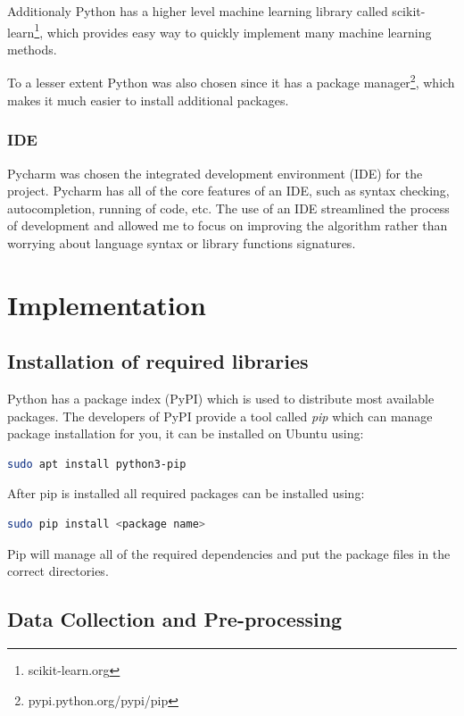 \documentclass[12pt,a4paper]{book}
\begin{document}
Additionaly Python has a higher level machine learning library called scikit-learn\footnote{scikit-learn.org}, which provides easy way to quickly implement many machine learning methods.

To a lesser extent Python was also chosen since it has a package manager\footnote{pypi.python.org/pypi/pip}, which makes it much easier to install additional packages.

\subsection{IDE}
Pycharm was chosen the integrated development environment (IDE) for the project.
Pycharm has all of the core features of an IDE, such as syntax checking, autocompletion, running of code, etc.
The use of an IDE streamlined the process of development and allowed me to focus on improving the algorithm rather than worrying about language syntax or library functions signatures. 


\chapter{Implementation}
\section{Installation of required libraries}
Python has a package index (PyPI) which is used to distribute most available packages.
The developers of PyPI provide a tool called \emph{pip} which can manage package installation for you, it can be installed on Ubuntu using:
\begin{lstlisting}[language=bash]
sudo apt install python3-pip
\end{lstlisting}
After pip is installed all required packages can be installed using:
\begin{lstlisting}[language=bash]
sudo pip install <package name>
\end{lstlisting}
Pip will manage all of the required dependencies and put the package files in the correct directories.
\section{Data Collection and Pre-processing}
\end{document}
